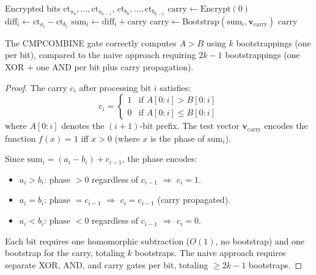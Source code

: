 \begin{algorithm}[H]
\caption{CMPCOMBINE --- Multi-Bit Comparison in One Pass}
\label{alg:cmpcombine}
\begin{algorithmic}[1]
\Require Encrypted bits $\text{ct}_{a_0}, \ldots, \text{ct}_{a_{k-1}}$, $\text{ct}_{b_0}, \ldots, \text{ct}_{b_{k-1}}$
\State $\text{carry} \gets \text{Encrypt}(0)$ 
 
    \State $\text{diff}_i \gets \text{ct}_{a_i} - \text{ct}_{b_i}$ 
    \State $\text{sum}_i \gets \text{diff}_i + \text{carry}$
    \State {}
    \State $\text{carry} \gets \text{Bootstrap}(\text{sum}_i, \mathbf{v}_{\text{carry}})$
\EndFor
\State \Return $\text{carry}$ 
\end{algorithmic}
\end{algorithm}

\begin{theorem}
\label{thm:cmpcombine}
The CMPCOMBINE gate correctly computes $A > B$ using $k$ bootstrappings (one per bit),
compared to the naive approach requiring $2k - 1$ bootstrappings (one XOR + one AND
per bit plus carry propagation).
\end{theorem}

\begin{proof}
The carry $c_i$ after processing bit $i$ satisfies:
\[
c_i = \begin{cases}
1 & \text{if } A[0:i] > B[0:i] \\
0 & \text{if } A[0:i] \leq B[0:i]
\end{cases}
\]
where $A[0:i]$ denotes the $(i+1)$-bit prefix. The test vector $\mathbf{v}_{\text{carry}}$
encodes the function $f(x) = 1$ iff $x > 0$ (where $x$ is the phase of $\text{sum}_i$).

Since $\text{sum}_i = (a_i - b_i) + c_{i-1}$, the phase encodes:
\begin{itemize}[nosep]
\item $a_i > b_i$: phase $> 0$ regardless of $c_{i-1}$ $\Rightarrow$ $c_i = 1$.
\item $a_i = b_i$: phase $= c_{i-1}$ $\Rightarrow$ $c_i = c_{i-1}$ (carry propagated).
\item $a_i < b_i$: phase $< 0$ regardless of $c_{i-1}$ $\Rightarrow$ $c_i = 0$.
\end{itemize}

Each bit requires one homomorphic subtraction ($O(1)$, no bootstrap) and one bootstrap
for the carry, totaling $k$ bootstraps. The naive approach requires separate XOR, AND,
and carry gates per bit, totaling $\geq 2k - 1$ bootstraps.
\end{proof}

